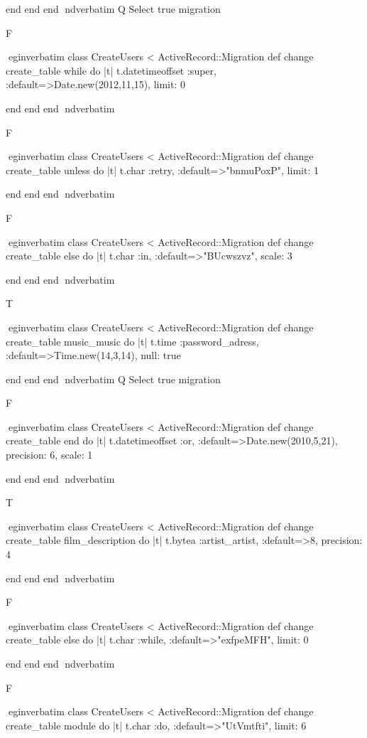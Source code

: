     end 
  end 
end
nd{verbatim}
Q
 Select true migration

F

egin{verbatim}
 class CreateUsers < ActiveRecord::Migration 
  def change 
    create_table while do |t| 
      t.datetimeoffset :super, :default=>Date.new(2012,11,15), limit: 0
    
    end 
  end 
end
nd{verbatim}

F

egin{verbatim}
 class CreateUsers < ActiveRecord::Migration 
  def change 
    create_table unless do |t| 
      t.char :retry, :default=>"bnmuPoxP", limit: 1
    
    end 
  end 
end
nd{verbatim}

F

egin{verbatim}
 class CreateUsers < ActiveRecord::Migration 
  def change 
    create_table else do |t| 
      t.char :in, :default=>"BUcwszvz", scale: 3
    
    end 
  end 
end
nd{verbatim}

T

egin{verbatim}
 class CreateUsers < ActiveRecord::Migration 
  def change 
    create_table music_music do |t| 
      t.time :password_adress, :default=>Time.new(14,3,14), null: true
    
    end 
  end 
end
nd{verbatim}
Q
 Select true migration

F

egin{verbatim}
 class CreateUsers < ActiveRecord::Migration 
  def change 
    create_table end do |t| 
      t.datetimeoffset :or, :default=>Date.new(2010,5,21), precision: 6, scale: 1
    
    end 
  end 
end
nd{verbatim}

T

egin{verbatim}
 class CreateUsers < ActiveRecord::Migration 
  def change 
    create_table film_description do |t| 
      t.bytea :artist_artist, :default=>8, precision: 4
    
    end 
  end 
end
nd{verbatim}

F

egin{verbatim}
 class CreateUsers < ActiveRecord::Migration 
  def change 
    create_table else do |t| 
      t.char :while, :default=>"exfpeMFH", limit: 0
    
    end 
  end 
end
nd{verbatim}

F

egin{verbatim}
 class CreateUsers < ActiveRecord::Migration 
  def change 
    create_table module do |t| 
      t.char :do, :default=>"UtVmtfti", limit: 6
    
